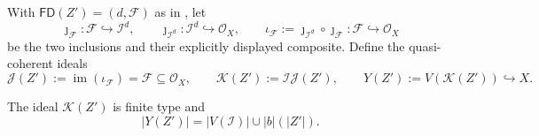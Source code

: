 \begin{definition}
  \label{def:nagata-composition-center-ideal}
  \lean{}

  With $\mathsf{FD}(Z')=(d,\mathcal F)$ as in
  , let
  \[
    \jmath_{\mathcal F}\colon\mathcal F\hookrightarrow\mathcal I^d,
    \qquad
    \jmath_{\mathcal I^d}\colon\mathcal I^d\hookrightarrow\mathcal O_X,
    \qquad
    \iota_{\mathcal F}:=
      \jmath_{\mathcal I^d}\circ\jmath_{\mathcal F}\colon
      \mathcal F\hookrightarrow\mathcal O_X
  \]
  be the two inclusions and their explicitly displayed composite.  Define the
  quasi-coherent ideals
  \[
    \mathcal J(Z'):=\operatorname{im}(\iota_{\mathcal F})
      =\mathcal F\subseteq\mathcal O_X,
    \qquad
    \mathcal K(Z'):=\mathcal I\mathcal J(Z'),
    \qquad
    Y(Z'):=V(\mathcal K(Z'))\hookrightarrow X.
  \]
\end{definition}

\begin{lemma}
  \label{lemma:nagata-composition-center-ideal}
  \lean{}

  The ideal $\mathcal K(Z')$ is finite type and
  \[
    |Y(Z')|=|V(\mathcal I)|\cup |b|(|Z'|).
  \]
\end{lemma}

